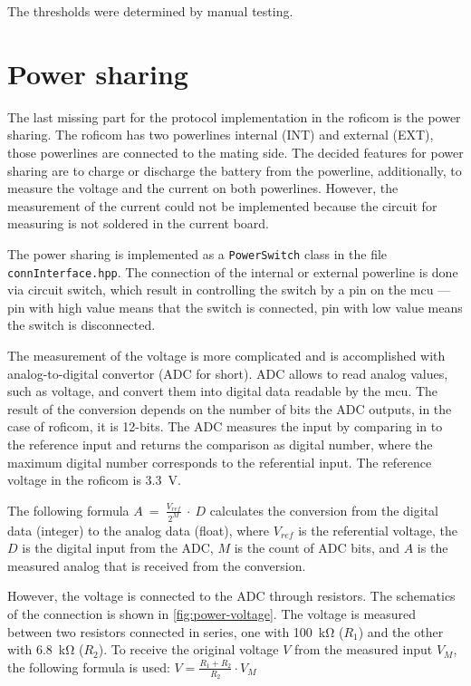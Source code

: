 \documentclass[
  digital,     %
  oneside,     %
  nosansbold,  %
  nocolorbold, %
  nolof,         %
  nolot,         %
]{fithesis4}
\begin{document}
{{{The thresholds were determined by manual testing.

\section{ Power sharing }

The last missing part for the protocol implementation in the \acrshort{roficom} is the power sharing. The \acrshort{roficom} has two powerlines internal (INT) and external (EXT), those powerlines are connected to the mating side. The decided features for power sharing are to charge or discharge the battery from the powerline, additionally, to measure the voltage and the current on both powerlines. However, the measurement of the current could not be implemented because the circuit for measuring is not soldered in the current board.

The power sharing is implemented as a \lstinline|PowerSwitch| class in the file \lstinline|connInterface.hpp|. The connection of the internal or external powerline is done via circuit switch, which result in controlling the switch by a pin on the \acrshort{mcu} --- pin with high value means that the switch is connected, pin with low value means the switch is disconnected.

The measurement of the voltage is more complicated and is accomplished with analog-to-digital convertor (ADC for short). ADC allows to read analog values, such as voltage, and convert them into digital data readable by the \acrshort{mcu}. The result of the conversion depends on the number of bits the ADC outputs, in the case of \acrshort{roficom}, it is 12-bits. The ADC measures the input by comparing in to the reference input and returns the comparison as digital number, where the maximum digital number corresponds to the referential input. The reference voltage in the \acrshort{roficom} is \qty{3.3}{\volt}.

The following formula $A~=~\frac{V_{ref}}{2^{M}}~\cdot~D$ calculates the conversion from the digital data (integer) to the analog data (float), where $V_{ref}$ is the referential voltage, the $D$ is the digital input from the ADC, $M$ is the count of ADC bits, and $A$ is the measured analog that is received from the conversion.

However, the voltage is connected to the ADC through resistors. The schematics of the connection is shown in \autoref{fig:power-voltage}. The voltage is measured between two resistors connected in series, one with \qty{100}{\kilo\ohm} ($R_1$) and the other with \qty{6.8}{\kilo\ohm} ($R_2$). To receive the original voltage $V$ from the measured input $V_M$, the following formula is used: $V = \frac{R_1 + R_2}{R_2} \cdot V_{M}$

}}}
\end{document}
